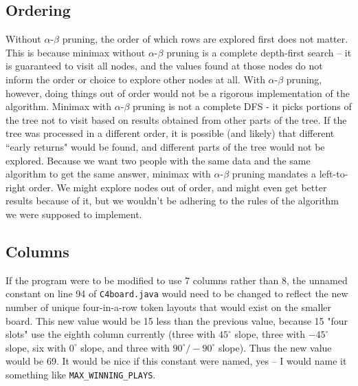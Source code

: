 \documentclass{article}
\begin{document}
\begin{doublespace}
\subsection{Ordering}
Without $\alpha$-$\beta$ pruning, the order of which rows are explored first does not matter. This is because minimax without $\alpha$-$\beta$ pruning is a complete depth-first search -- it is guaranteed to visit all nodes, and the values found at those nodes do not inform the order or choice to explore other nodes at all. With $\alpha$-$\beta$ pruning, however, doing things out of order would not be a rigorous implementation of the algorithm. Minimax with $\alpha$-$\beta$ pruning is not a complete DFS - it picks portions of the tree not to visit based on results obtained from other parts of the tree. If the tree was processed in a different order, it is possible (and likely) that different ``early returns" would be found, and different parts of the tree would not be explored. Because we want two people with the same data and the same algorithm to get the same answer, minimax with $\alpha$-$\beta$ pruning mandates a left-to-right order. We might explore nodes out of order, and might even get better results because of it, but we wouldn't be adhering to the rules of the algorithm we were supposed to implement.

\subsection{Columns}
If the program were to be modified to use 7 columns rather than 8, the unnamed constant on line 94 of \texttt{C4board.java} would need to be changed to reflect the new number of unique four-in-a-row token layouts that would exist on the smaller board. This new value would be 15 less than the previous value, because 15 "four slots" use the eighth column currently (three with $45^{\circ}$ slope, three with $-45^{\circ}$ slope, six with $0^{\circ}$ slope, and three with $90^{\circ}/-90^{\circ}$ slope). Thus the new value would be 69. It would be nice if this constant were named, yes -- I would name it something like \texttt{MAX\_WINNING\_PLAYS}.


\end{doublespace}
\end{document}
